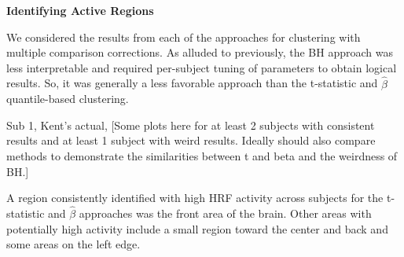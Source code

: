 \noindent \textbf{Identifying Active Regions}

We considered the results from each of the approaches for clustering with multiple comparison corrections. As alluded to previously, the BH approach was less interpretable and required per-subject tuning of parameters to obtain logical results. So, it was generally a less favorable approach than the t-statistic and $\hat{\beta}$ quantile-based clustering. 

Sub 1, Kent's actual, 
[Some plots here for at least 2 subjects with consistent results and at least 1 subject with weird results. Ideally should also compare methods to demonstrate the similarities between t and beta and the weirdness of BH.]

A region consistently identified with high HRF activity across subjects for the t-statistic and $\hat{\beta}$ approaches was the front area of the brain. Other areas with potentially high activity include a small region toward the center and back and some areas on the left edge. 
\vspace{5mm}


